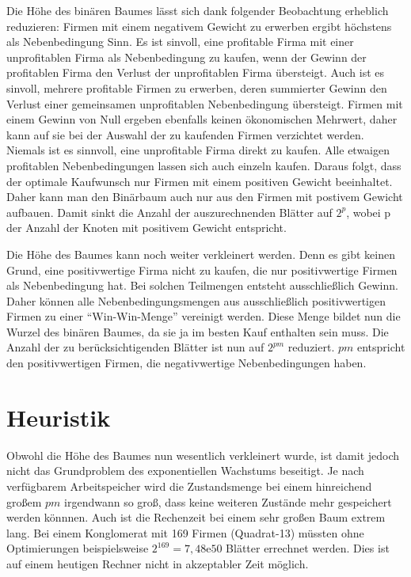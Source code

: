 Die Höhe des binären Baumes lässt sich dank folgender Beobachtung erheblich reduzieren:
Firmen mit einem negativem Gewicht zu erwerben ergibt höchstens als Nebenbedingung Sinn. Es ist sinvoll, eine profitable Firma mit einer unprofitablen Firma als Nebenbedingung zu kaufen, wenn der Gewinn der profitablen Firma den Verlust der unprofitablen Firma übersteigt. Auch ist es sinvoll, mehrere profitable Firmen zu erwerben, deren summierter Gewinn den Verlust einer gemeinsamen unprofitablen Nebenbedingung übersteigt. Firmen mit einem Gewinn von Null ergeben ebenfalls keinen ökonomischen Mehrwert, daher kann auf sie bei der Auswahl der zu kaufenden Firmen verzichtet werden.
Niemals ist es sinnvoll, eine unprofitable Firma direkt zu kaufen. Alle etwaigen profitablen Nebenbedingungen lassen sich auch einzeln kaufen. Daraus folgt, dass der optimale Kaufwunsch nur Firmen mit einem positiven Gewicht beeinhaltet. Daher kann man den Binärbaum auch nur aus den Firmen mit postivem Gewicht aufbauen. Damit sinkt die Anzahl der auszurechnenden Blätter auf \(2^p\), wobei p der Anzahl der Knoten mit positivem Gewicht entspricht.

Die Höhe des Baumes kann noch weiter verkleinert werden. Denn es gibt keinen Grund, eine positivwertige Firma nicht zu kaufen, die nur positivwertige Firmen als Nebenbedingung hat. Bei solchen Teilmengen entsteht ausschließlich Gewinn. Daher können alle Nebenbedingungsmengen aus ausschließlich positivwertigen Firmen zu einer "`Win-Win-Menge"' vereinigt werden. Diese Menge bildet nun die Wurzel des binären Baumes, da sie ja im besten Kauf enthalten sein muss. Die Anzahl der zu berücksichtigenden Blätter ist nun auf \(2^{pm}\) reduziert. \(pm\) entspricht den positivwertigen Firmen, die negativwertige Nebenbedingungen haben.

\section{Heuristik}
Obwohl die Höhe des Baumes nun wesentlich verkleinert wurde, ist damit jedoch nicht das Grundproblem des exponentiellen Wachstums beseitigt. Je nach verfügbarem Arbeitspeicher wird die Zustandsmenge bei einem hinreichend großem \(pm\) irgendwann so groß, dass keine weiteren Zustände mehr gespeichert werden könnnen. Auch ist die Rechenzeit bei einem sehr großen Baum extrem lang. Bei einem Konglomerat mit 169 Firmen (Quadrat-13) müssten ohne Optimierungen beispielsweise \(2^{169}=7,48\mathrm{e}{50}\) Blätter errechnet werden. Dies ist auf einem heutigen Rechner nicht in akzeptabler Zeit möglich.

